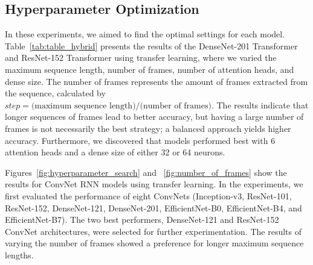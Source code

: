 \documentclass[fleqn,10pt]{wlscirep}
\begin{document}
\subsection{Hyperparameter Optimization}


In these experiments, we aimed to find the optimal settings for each model. Table~\ref{tab:table_hybrid} presents the results of the DenseNet-201 Transformer and ResNet-152 Transformer using transfer learning, where we varied the maximum sequence length, number of frames, number of attention heads, and dense size. The number of frames represents the amount of frames extracted from the sequence, calculated by $step=\mbox{(maximum sequence length)/(number of frames)}$. The results indicate that longer sequences of frames lead to better accuracy, but having a large number of frames is not necessarily the best strategy; a balanced approach yields higher accuracy. Furthermore, we discovered that models performed best with 6 attention heads and a dense size of either 32 or 64 neurons.

Figures~\ref{fig:hyperparameter_search} and ~\ref{fig:number_of_frames} show the results for ConvNet RNN models using transfer learning. In the experiments, we first evaluated the performance of eight ConvNets (Inception-v3, ResNet-101, ResNet-152, DenseNet-121, DenseNet-201, EfficientNet-B0, EfficientNet-B4, and EfficientNet-B7). The two best performers, DenseNet-121 and ResNet-152 ConvNet architectures, were selected for further experimentation. The results of varying the number of frames showed a preference for longer maximum sequence lengths.
\end{document}
